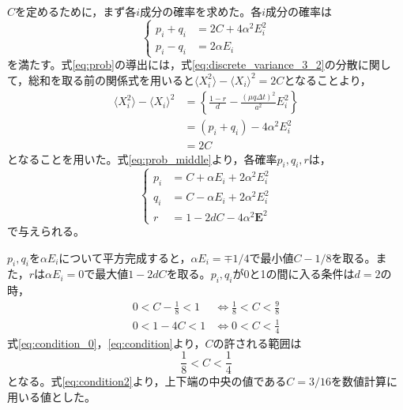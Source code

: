 \documentclass[autodetect-engine,dvi=dvipdfmx,a4paper,ja=standard,oneside,openany,11pt]{bxjsbook}
\begin{document}
$C$を定めるために，まず各$i$成分の確率を求めた。各$i$成分の確率は
\begin{equation}
  \left\{
  \begin{aligned}
    p_i+q_i & =2C+4\alpha^2E_i^2 \\
    p_i-q_i & =2\alpha E_i
  \end{aligned}
  \right.
  \label{eq:prob}
\end{equation}
を満たす。式\eqref{eq:prob}の導出には，式\eqref{eq:discrete_variance_3_2}の分散に関して，総和を取る前の関係式を用いると$\langle X_i^2\rangle-\langle X_i\rangle^2=2C$となることより，
\begin{equation}
  \begin{split}
    \langle X_i^2\rangle-\langle X_i\rangle^2 & =\left\{\frac{1-r}{d}-\frac{(\mu q \Delta t)^2}{a^2}E_i^2\right\} \\
                                              & =(p_i+q_i)-4\alpha^2E_i^2                                         \\
                                              & =2C
  \end{split}
  \label{eq:prob_middle}
\end{equation}
となることを用いた。式\eqref{eq:prob_middle}より，各確率$p_i,q_i,r$は，
\begin{equation}
  \left\{
  \begin{aligned}
    p_i & =C+\alpha E_i+2\alpha^2 E_i^2 \\
    q_i & =C-\alpha E_i+2\alpha^2 E_i^2 \\
    r   & =1-2dC-4\alpha^2\bm{E}^2
  \end{aligned}
  \right.
  \label{eq:prob3}
\end{equation}
で与えられる。

$p_i,q_i$を$\alpha E_i$について平方完成すると，$\alpha E_i=\mp1/4$で最小値$C-1/8$を取る。また，$r$は$\alpha E_i=0$で最大値$1-2dC$を取る。$p_i,q_i$が0と1の間に入る条件は$d=2$の時，
\begin{align}
  0<C-\frac{1}{8}<1 & \Leftrightarrow  \frac{1}{8}<C<\frac{9}{8} \label{eq:condition_0} \\
  0<1-4C<1          & \Leftrightarrow  0<C<\frac{1}{4}
  \label{eq:condition}
\end{align}
式\eqref{eq:condition_0}，\eqref{eq:condition}より，$C$の許される範囲は
\begin{equation}
  \frac{1}{8}<C<\frac{1}{4}
  \label{eq:condition2}
\end{equation}
となる。式\eqref{eq:condition2}より，上下端の中央の値である$C=3/16$を数値計算に用いる値とした。
\end{document}
